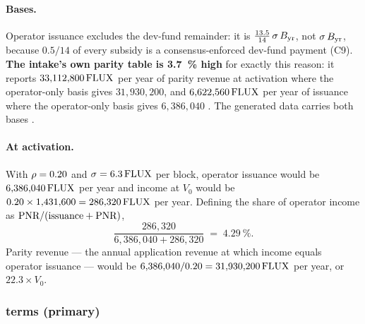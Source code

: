 \paragraph{Bases.} Operator issuance excludes the dev-fund remainder: it is
$\tfrac{13.5}{14}\,\sigma\,B_{\mathrm{yr}}$, not $\sigma\,B_{\mathrm{yr}}$, because $0.5/14$ of every
\PoN subsidy is a consensus-enforced dev-fund payment \shipped
{} (C9). \textbf{The intake's own parity table is
\SI{3.7}{\percent} high} for exactly this reason: it reports $33{,}112{,}800\,\mathrm{FLUX}$ per year of parity
revenue at activation where the operator-only basis gives $31{,}930{,}200$, and
$6{,}622{,}560\,\mathrm{FLUX}$ per year of issuance where the operator-only basis gives $6{,}386{,}040$
. The generated data carries both bases
.

\paragraph{At activation.} With $\rho = 0.20$ and $\sigma = 6.3\,\mathrm{FLUX}$ per block, operator
issuance would be $6{,}386{,}040\,\mathrm{FLUX}$ per year and \PNR income at $V_0$ would be
$0.20 \times 1{,}431{,}600 = 286{,}320\,\mathrm{FLUX}$ per year. Defining the \PNR share of operator income as
$\text{PNR}/(\text{issuance} + \text{PNR})$,
\[
  \frac{286{,}320}{6{,}386{,}040 + 286{,}320} \;=\; \SI{4.29}{\percent}.
\]
Parity revenue --- the annual application revenue at which \PNR income equals operator issuance ---
would be $6{,}386{,}040/0.20 = 31{,}930{,}200\,\mathrm{FLUX}$ per year, or $22.3\times V_0$.

\subsubsection{\flux terms (primary)}
\label{sec:pnr:fluxterms}

